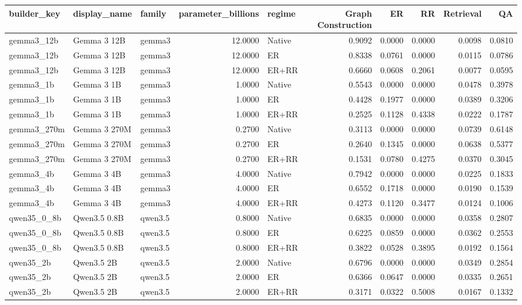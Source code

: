 \begin{tabular}{lllrlrrrrr}
\toprule
builder_key & display_name & family & parameter_billions & regime & Graph Construction & ER & RR & Retrieval & QA \\
\midrule
gemma3_12b & Gemma 3 12B & gemma3 & 12.0000 & Native & 0.9092 & 0.0000 & 0.0000 & 0.0098 & 0.0810 \\
gemma3_12b & Gemma 3 12B & gemma3 & 12.0000 & ER & 0.8338 & 0.0761 & 0.0000 & 0.0115 & 0.0786 \\
gemma3_12b & Gemma 3 12B & gemma3 & 12.0000 & ER+RR & 0.6660 & 0.0608 & 0.2061 & 0.0077 & 0.0595 \\
gemma3_1b & Gemma 3 1B & gemma3 & 1.0000 & Native & 0.5543 & 0.0000 & 0.0000 & 0.0478 & 0.3978 \\
gemma3_1b & Gemma 3 1B & gemma3 & 1.0000 & ER & 0.4428 & 0.1977 & 0.0000 & 0.0389 & 0.3206 \\
gemma3_1b & Gemma 3 1B & gemma3 & 1.0000 & ER+RR & 0.2525 & 0.1128 & 0.4338 & 0.0222 & 0.1787 \\
gemma3_270m & Gemma 3 270M & gemma3 & 0.2700 & Native & 0.3113 & 0.0000 & 0.0000 & 0.0739 & 0.6148 \\
gemma3_270m & Gemma 3 270M & gemma3 & 0.2700 & ER & 0.2640 & 0.1345 & 0.0000 & 0.0638 & 0.5377 \\
gemma3_270m & Gemma 3 270M & gemma3 & 0.2700 & ER+RR & 0.1531 & 0.0780 & 0.4275 & 0.0370 & 0.3045 \\
gemma3_4b & Gemma 3 4B & gemma3 & 4.0000 & Native & 0.7942 & 0.0000 & 0.0000 & 0.0225 & 0.1833 \\
gemma3_4b & Gemma 3 4B & gemma3 & 4.0000 & ER & 0.6552 & 0.1718 & 0.0000 & 0.0190 & 0.1539 \\
gemma3_4b & Gemma 3 4B & gemma3 & 4.0000 & ER+RR & 0.4273 & 0.1120 & 0.3477 & 0.0124 & 0.1006 \\
qwen35_0_8b & Qwen3.5 0.8B & qwen3.5 & 0.8000 & Native & 0.6835 & 0.0000 & 0.0000 & 0.0358 & 0.2807 \\
qwen35_0_8b & Qwen3.5 0.8B & qwen3.5 & 0.8000 & ER & 0.6225 & 0.0859 & 0.0000 & 0.0362 & 0.2553 \\
qwen35_0_8b & Qwen3.5 0.8B & qwen3.5 & 0.8000 & ER+RR & 0.3822 & 0.0528 & 0.3895 & 0.0192 & 0.1564 \\
qwen35_2b & Qwen3.5 2B & qwen3.5 & 2.0000 & Native & 0.6796 & 0.0000 & 0.0000 & 0.0349 & 0.2854 \\
qwen35_2b & Qwen3.5 2B & qwen3.5 & 2.0000 & ER & 0.6366 & 0.0647 & 0.0000 & 0.0335 & 0.2651 \\
qwen35_2b & Qwen3.5 2B & qwen3.5 & 2.0000 & ER+RR & 0.3171 & 0.0322 & 0.5008 & 0.0167 & 0.1332 \\

\end{tabular}
